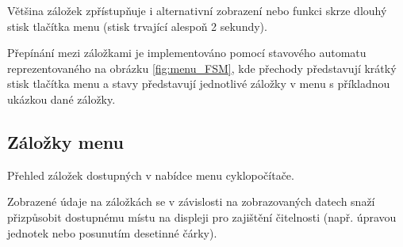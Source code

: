\documentclass[twocolumn,a4paper,10pt]{article}
\begin{document}
Většina záložek zpřístupňuje i alternativní zobrazení nebo funkci skrze dlouhý stisk tlačítka menu (stisk trvající alespoň 2 sekundy).

Přepínání mezi záložkami je implementováno pomocí stavového automatu reprezentovaného na obrázku \ref{fig:menu_FSM}, kde přechody představují krátký stisk tlačítka menu a stavy představují jednotlivé záložky v menu s příkladnou ukázkou dané záložky.

\subsection{Záložky menu}
Přehled záložek dostupných v nabídce menu cyklopočítače.

Zobrazené údaje na záložkách se v závislosti na zobrazovaných datech snaží přizpůsobit dostupnému místu na displeji pro zajištění čitelnosti (např. úpravou jednotek nebo posunutím desetinné čárky).
\end{document}
